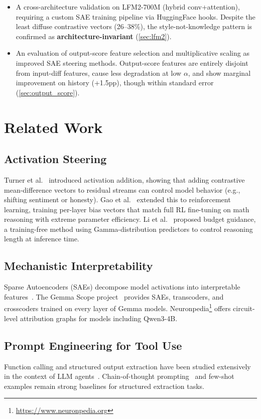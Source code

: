 \documentclass[11pt,a4paper]{article}
\begin{document}
\begin{itemize}
    \item A cross-architecture validation on LFM2-700M (hybrid conv+attention), requiring a custom SAE training pipeline via HuggingFace hooks. Despite the least diffuse contrastive vectors (26--38\%), the style-not-knowledge pattern is confirmed as \textbf{architecture-invariant} (\cref{sec:lfm2}).
    \item An evaluation of output-score feature selection and multiplicative scaling as improved SAE steering methods. Output-score features are entirely disjoint from input-diff features, cause less degradation at low $\alpha$, and show marginal improvement on history (+1.5pp), though within standard error (\cref{sec:output_score}).
\end{itemize}

\section{Related Work}
\label{sec:related}

\subsection{Activation Steering}
Turner et al.~\cite{turner2023activation} introduced activation addition, showing that adding contrastive mean-difference vectors to residual streams can control model behavior (e.g., shifting sentiment or honesty). Gao et al.~\cite{gao2025steering} extended this to reinforcement learning, training per-layer bias vectors that match full RL fine-tuning on math reasoning with extreme parameter efficiency. Li et al.~\cite{li2025budget} proposed budget guidance, a training-free method using Gamma-distribution predictors to control reasoning length at inference time.

\subsection{Mechanistic Interpretability}
Sparse Autoencoders (SAEs) decompose model activations into interpretable features~\cite{cunningham2023sparse}. The Gemma Scope project~\cite{lieberum2024gemma} provides SAEs, transcoders, and crosscoders trained on every layer of Gemma models. Neuronpedia\footnote{\url{https://www.neuronpedia.org}} offers circuit-level attribution graphs for models including Qwen3-4B.

\subsection{Prompt Engineering for Tool Use}
Function calling and structured output extraction have been studied extensively in the context of LLM agents~\cite{schick2023toolformer}. Chain-of-thought prompting~\cite{wei2022chain} and few-shot examples remain strong baselines for structured extraction tasks.
\end{document}
